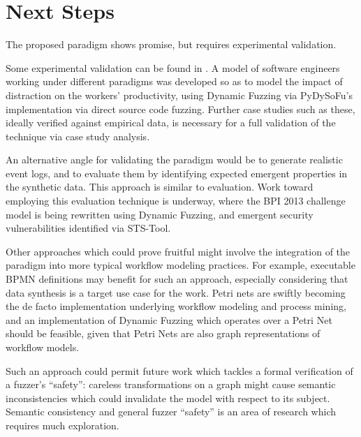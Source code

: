 \documentclass[12pt]{llncs}  %
\begin{document}
\section{Next Steps}
\label{sec:future_work}
\label{sec:conclusion}
The proposed paradigm shows promise, but requires experimental validation.
\par

Some experimental validation can be found in \cite{wallis2018modelling}. A model
of software engineers working under different paradigms was developed so as to
model the impact of distraction on the workers' productivity, using Dynamic
Fuzzing via PyDySoFu's implementation via direct source code fuzzing. Further
case studies such as these, ideally verified against empirical data, is
necessary for a full validation of the technique via case study analysis.
\par

An alternative angle for validating the paradigm would be to generate realistic
event logs, and to evaluate them by identifying expected emergent properties in
the synthetic data. This approach is similar to \cite['s]{accorsi2013secsy}
evaluation. Work toward employing this evaluation technique is underway, where
the BPI 2013 challenge model is being rewritten using Dynamic
Fuzzing, and emergent security vulnerabilities identified via
STS-Tool\cite{salnitri2015sts}.
\par

Other approaches which could prove fruitful might involve the integration of the
paradigm into more typical workflow modeling practices. For example, executable
BPMN definitions\cite{mitsyuk2017generating} may benefit for such an approach,
especially considering that data synthesis is a target use case for the work.
Petri nets are swiftly becoming the de facto implementation underlying workflow
modeling and process mining, and an
implementation of Dynamic Fuzzing which operates over a Petri Net should be
feasible, given that Petri Nets are also graph representations of workflow
models. 
\par

Such an approach could permit future work which tackles a formal verification of
a fuzzer's ``safety'': careless transformations on a graph might cause semantic
inconsistencies which could invalidate the model with respect to its
subject. Semantic consistency and general fuzzer ``safety'' is an area
of research which requires much exploration.
\par
\end{document}

